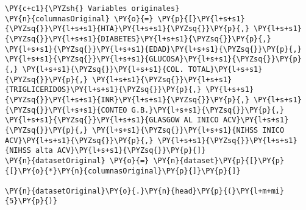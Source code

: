     \begin{tcolorbox}[breakable, size=fbox, boxrule=1pt, pad at break*=1mm,colback=cellbackground, colframe=cellborder]
\begin{Verbatim}[commandchars=\\\{\}]
\PY{c+c1}{\PYZsh{} Variables originales}
\PY{n}{columnasOriginal} \PY{o}{=} \PY{p}{[}\PY{l+s+s1}{\PYZsq{}}\PY{l+s+s1}{HTA}\PY{l+s+s1}{\PYZsq{}}\PY{p}{,} \PY{l+s+s1}{\PYZsq{}}\PY{l+s+s1}{DIABETES}\PY{l+s+s1}{\PYZsq{}}\PY{p}{,} \PY{l+s+s1}{\PYZsq{}}\PY{l+s+s1}{EDAD}\PY{l+s+s1}{\PYZsq{}}\PY{p}{,} \PY{l+s+s1}{\PYZsq{}}\PY{l+s+s1}{GLUCOSA}\PY{l+s+s1}{\PYZsq{}}\PY{p}{,} \PY{l+s+s1}{\PYZsq{}}\PY{l+s+s1}{COL. TOTAL}\PY{l+s+s1}{\PYZsq{}}\PY{p}{,} \PY{l+s+s1}{\PYZsq{}}\PY{l+s+s1}{TRIGLICERIDOS}\PY{l+s+s1}{\PYZsq{}}\PY{p}{,} \PY{l+s+s1}{\PYZsq{}}\PY{l+s+s1}{INR}\PY{l+s+s1}{\PYZsq{}}\PY{p}{,} \PY{l+s+s1}{\PYZsq{}}\PY{l+s+s1}{CONTEO G.B.}\PY{l+s+s1}{\PYZsq{}}\PY{p}{,} \PY{l+s+s1}{\PYZsq{}}\PY{l+s+s1}{GLASGOW AL INICO ACV}\PY{l+s+s1}{\PYZsq{}}\PY{p}{,} \PY{l+s+s1}{\PYZsq{}}\PY{l+s+s1}{NIHSS INICO ACV}\PY{l+s+s1}{\PYZsq{}}\PY{p}{,} \PY{l+s+s1}{\PYZsq{}}\PY{l+s+s1}{NIHSS alta ACV}\PY{l+s+s1}{\PYZsq{}}\PY{p}{]}
\PY{n}{datasetOriginal} \PY{o}{=} \PY{n}{dataset}\PY{p}{[}\PY{p}{[}\PY{o}{*}\PY{n}{columnasOriginal}\PY{p}{]}\PY{p}{]}

\PY{n}{datasetOriginal}\PY{o}{.}\PY{n}{head}\PY{p}{(}\PY{l+m+mi}{5}\PY{p}{)}
\end{Verbatim}
\end{tcolorbox}

